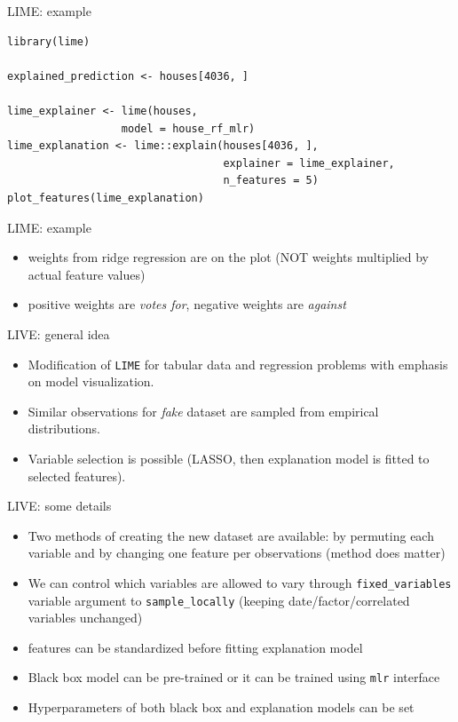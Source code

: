 \documentclass[xcolor={dvipsnames}]{beamer}
\begin{document}
\begin{frame}[fragile]{LIME: example}
\begin{lstlisting}
library(lime)

explained_prediction <- houses[4036, ]

lime_explainer <- lime(houses,
                  model = house_rf_mlr)
lime_explanation <- lime::explain(houses[4036, ],
                                  explainer = lime_explainer,
                                  n_features = 5)
plot_features(lime_explanation)	
\end{lstlisting}
\end{frame}

\begin{frame}{LIME: example}
\begin{itemize}
	\item weights from ridge regression are on the plot (NOT weights multiplied by actual feature values)
	\item positive weights are \textit{votes for}, negative weights are \textit{against}
\end{itemize}
\end{frame}

\begin{frame}{LIVE: general idea}
   \begin{itemize}
   	\item Modification of \texttt{LIME} for tabular data and regression problems with emphasis on model visualization.
   	\item Similar observations for \textit{fake} dataset are sampled from empirical distributions.
    \item Variable selection is possible (LASSO, then explanation model is fitted to selected features).
   \end{itemize}
\end{frame}

\begin{frame}{LIVE: some details}
	\begin{itemize}
	\item Two methods of creating the new dataset are available: by permuting each variable and by changing one feature per observations (method does matter)
	\item We can control which variables are allowed to vary through \texttt{fixed\_variables} variable argument to \texttt{sample\_locally} (keeping date/factor/correlated variables unchanged)
	\item features can be standardized before fitting explanation model
	\item Black box model can be pre-trained or it can be trained using \texttt{mlr} interface
	\item Hyperparameters of both black box and explanation models can be set
	\end{itemize}
	
\end{frame}
\end{document}
